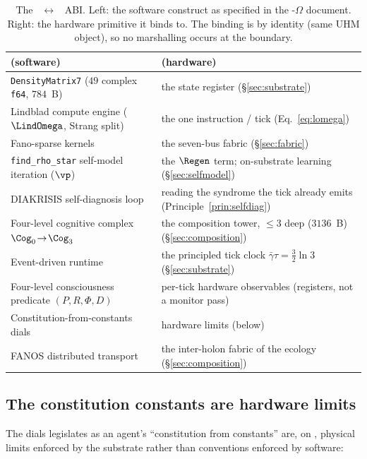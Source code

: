 \begin{table}[H]
\centering\small
\caption{The \SYNARC{}~$\leftrightarrow$~\TALOS{} ABI. Left: the software
construct as specified in the \SYNARC{}-$\Omega$ document. Right: the
hardware primitive it binds to. The binding is by identity (same UHM object),
so no marshalling occurs at the boundary.}
\label{tab:abi}
\begin{tabular}{@{}p{5.4cm}p{6.4cm}@{}}
\toprule
\textbf{\SYNARC{} (software)} & \textbf{\TALOS{} (hardware)} \\
\midrule
\texttt{DensityMatrix7} ($49$ complex \texttt{f64}, $784$~B) & the state register \DM{} (\S\ref{sec:substrate}) \\
Lindblad compute engine ($\LindOmega$, Strang split) & the one instruction / tick (Eq.~\ref{eq:lomega}) \\
Fano-sparse kernels & the seven-bus fabric (\S\ref{sec:fabric}) \\
\texttt{find\_rho\_star} self-model iteration ($\vp$) & the $\Regen$ term; on-substrate learning (\S\ref{sec:selfmodel}) \\
DIAKRISIS self-diagnosis loop & reading the syndrome the tick already emits (Principle~\ref{prin:selfdiag}) \\
Four-level cognitive complex $\Cog_0\!\to\!\Cog_3$ & the composition tower, $\le 3$ deep ($3136$~B) (\S\ref{sec:composition}) \\
Event-driven runtime & the principled tick clock $\bar\gamma\tau=\tfrac32\ln3$ (\S\ref{sec:substrate}) \\
Four-level consciousness predicate $(P,R,\Phi,D)$ & per-tick hardware observables (registers, not a monitor pass) \\
Constitution-from-constants dials & hardware limits (below) \\
FANOS distributed transport & the inter-holon fabric of the ecology (\S\ref{sec:composition}) \\
\bottomrule
\end{tabular}
\end{table}

\subsection{The constitution constants are hardware limits}

The dials \SYNARC{} legislates as an agent's ``constitution from constants''
are, on \TALOS{}, physical limits enforced by the substrate rather than
conventions enforced by software:

